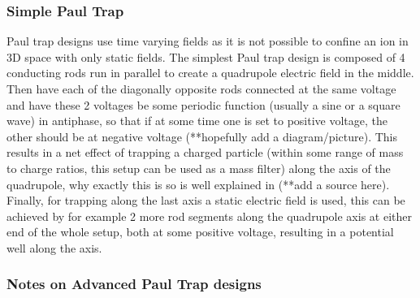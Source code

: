 \subsubsection{Simple Paul Trap}
Paul trap designs use time varying fields as it is not possible to confine an ion in 3D space with only static fields.
The simplest Paul trap design is composed of 4 conducting rods run in parallel to create a quadrupole electric field in the middle.
Then have each of the diagonally opposite rods connected at the same voltage and have these 2 voltages be some periodic function (usually a sine or a square wave) in antiphase, so that if at some time one is set to positive voltage, the other should be at negative voltage (**hopefully add a diagram/picture).
This results in a net effect of trapping a charged particle (within some range of mass to charge ratios, this setup can be used as a mass filter) along the axis of the quadrupole, why exactly this is so is well explained in (**add a source here).
Finally, for trapping along the last axis a static electric field is used, this can be achieved by for example 2 more rod segments along the quadrupole axis at either end of the whole setup, both at some positive voltage, resulting in a potential well along the axis.


\subsubsection{Notes on Advanced Paul Trap designs}



